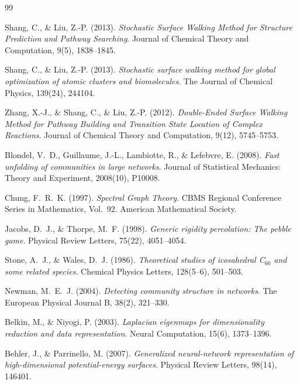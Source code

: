 \documentclass[11pt,a4paper]{article}
\begin{document}
\begin{thebibliography}{99}

Shang, C., \& Liu, Z.-P. (2013).
\textit{Stochastic Surface Walking Method for Structure Prediction and Pathway Searching}.
Journal of Chemical Theory and Computation, 9(5), 1838--1845.

Shang, C., \& Liu, Z.-P. (2013).
\textit{Stochastic surface walking method for global optimization of atomic clusters and biomolecules}.
The Journal of Chemical Physics, 139(24), 244104.

Zhang, X.-J., \& Shang, C., \& Liu, Z.-P. (2012).
\textit{Double-Ended Surface Walking Method for Pathway Building and Transition State Location of Complex Reactions}.
Journal of Chemical Theory and Computation, 9(12), 5745--5753.


Blondel, V.~D., Guillaume, J.-L., Lambiotte, R., \& Lefebvre, E. (2008).
\textit{Fast unfolding of communities in large networks}.
Journal of Statistical Mechanics: Theory and Experiment, 2008(10), P10008.

Chung, F.~R.~K. (1997).
\textit{Spectral Graph Theory}.
CBMS Regional Conference Series in Mathematics, Vol.~92. American Mathematical Society.

Jacobs, D.~J., \& Thorpe, M.~F. (1998).
\textit{Generic rigidity percolation: The pebble game}.
Physical Review Letters, 75(22), 4051--4054.

Stone, A.~J., \& Wales, D.~J. (1986).
\textit{Theoretical studies of icosahedral C$_{60}$ and some related species}.
Chemical Physics Letters, 128(5--6), 501--503.

Newman, M.~E.~J. (2004).
\textit{Detecting community structure in networks}.
The European Physical Journal B, 38(2), 321--330.

Belkin, M., \& Niyogi, P. (2003).
\textit{Laplacian eigenmaps for dimensionality reduction and data representation}.
Neural Computation, 15(6), 1373--1396.


Behler, J., \& Parrinello, M. (2007).
\textit{Generalized neural-network representation of high-dimensional potential-energy surfaces}.
Physical Review Letters, 98(14), 146401.


\end{thebibliography}
\end{document}
